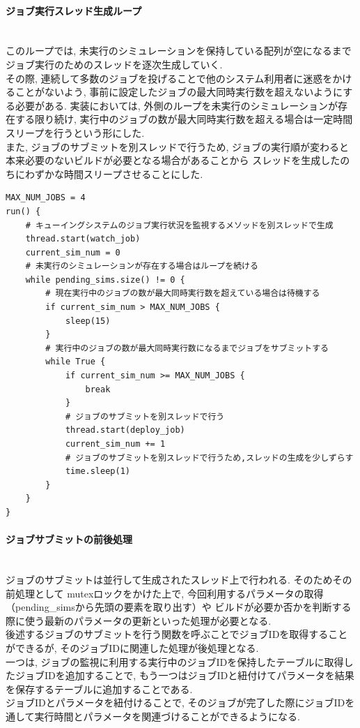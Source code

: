 \paragraph{ジョブ実行スレッド生成ループ}~\\
このループでは, 未実行のシミュレーションを保持している配列が空になるまで
ジョブ実行のためのスレッドを逐次生成していく.\\
その際, 連続して多数のジョブを投げることで他のシステム利用者に迷惑をかけることがないよう,
事前に設定したジョブの最大同時実行数を超えないようにする必要がある.
実装においては, 外側のループを未実行のシミュレーションが存在する限り続け,
実行中のジョブの数が最大同時実行数を超える場合は一定時間スリープを行うという形にした.\\
また, ジョブのサブミットを別スレッドで行うため, ジョブの実行順が変わると本来必要のないビルドが必要となる場合があることから
スレッドを生成したのちにわずかな時間スリープさせることにした.\\

{\footnotesize
\begin{lstlisting}[numbers=none, caption=ジョブ実行スレッドを生成するループ　疑似コード]
MAX_NUM_JOBS = 4
run() {
    # キューイングシステムのジョブ実行状況を監視するメソッドを別スレッドで生成
    thread.start(watch_job)
    current_sim_num = 0
    # 未実行のシミュレーションが存在する場合はループを続ける
    while pending_sims.size() != 0 {
        # 現在実行中のジョブの数が最大同時実行数を超えている場合は待機する
        if current_sim_num > MAX_NUM_JOBS {
            sleep(15)
        }
        # 実行中のジョブの数が最大同時実行数になるまでジョブをサブミットする
        while True {
            if current_sim_num >= MAX_NUM_JOBS {
                break
            }
            # ジョブのサブミットを別スレッドで行う
            thread.start(deploy_job)
            current_sim_num += 1
            # ジョブのサブミットを別スレッドで行うため,スレッドの生成を少しずらす
            time.sleep(1)
        }
    }
}
\end{lstlisting}
}

\paragraph{ジョブサブミットの前後処理}~\\
ジョブのサブミットは並行して生成されたスレッド上で行われる. そのためその前処理として
mutexロックをかけた上で, 今回利用するパラメータの取得（pending\_simsから先頭の要素を取り出す）や
ビルドが必要か否かを判断する際に使う最新のパラメータの更新といった処理が必要となる.\\
後述するジョブのサブミットを行う関数を呼ぶことでジョブIDを取得することができるが, そのジョブIDに関連した処理が後処理となる.\\
一つは, ジョブの監視に利用する実行中のジョブIDを保持したテーブルに取得したジョブIDを追加することで,
もう一つはジョブIDと紐付けてパラメータを結果を保存するテーブルに追加することである.\\
ジョブIDとパラメータを紐付けることで, そのジョブが完了した際にジョブIDを通して実行時間とパラメータを関連づけることができるようになる.\\

